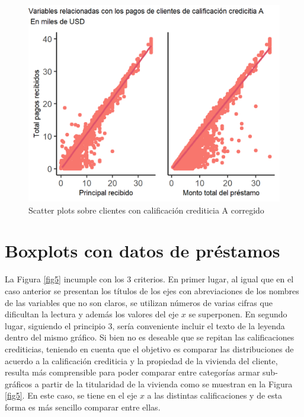 \documentclass[10.5pt]{article}   %
\begin{document}
\begin{figure}[H]
\centering
\includegraphics[scale=1.3]{imgs/scatter plot2.png}
\caption{Scatter plots sobre clientes con calificación crediticia A corregido}
    \label{fig4}
\end{figure}

\section*{Boxplots con datos de préstamos}
La Figura \ref{fig5} incumple con los 3 criterios. En primer lugar, al igual que en el caso anterior se presentan los títulos de los ejes con abreviaciones de los nombres de las variables que no son claros, se utilizan números de varias cifras que dificultan la lectura y además los valores del eje $x$ se superponen. En segundo lugar, siguiendo el principio 3, sería conveniente incluir el texto de la leyenda dentro del mismo gráfico. Si bien no es deseable que se repitan las calificaciones crediticias, teniendo en cuenta que el objetivo es comparar las distribuciones de acuerdo a la calificación crediticia y la propiedad de la vivienda del cliente, resulta más comprensible para poder comparar entre categorías armar sub-gráficos a partir de la titularidad de la vivienda como se muestran en la Figura \ref{fig5}. En este caso, se tiene en el eje $x$ a las distintas calificaciones y de esta forma es más sencillo comparar entre ellas.
\end{document}
